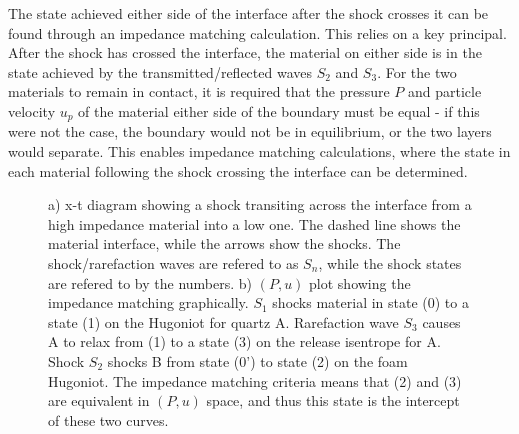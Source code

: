 The state achieved either side of the interface after the shock crosses it can be found through an impedance matching calculation. This relies on a key principal. After the shock has crossed the interface, the material on either side is in the state achieved by the transmitted/reflected waves $S_2$ and $S_3$. For the two materials to remain in contact, it is required that the pressure $P$ and particle velocity $u_p$ of the material either side of the boundary must be equal - if this were not the case, the boundary would not be in equilibrium, or the two layers would separate. This enables impedance matching calculations, where the state in each material following the shock crossing the interface can be determined.

\begin{figure}
\centering     %
{}
\caption{ \label{fig:ShockDiagramAndIMTheory1} a) x-t diagram showing a shock transiting across the interface from a high impedance material into a low one. The dashed line shows the material interface, while the arrows show the shocks. The shock/rarefaction waves are refered to as $S_n$, while the shock states are refered to by the numbers. b) $(P,u)$ plot showing the impedance matching graphically. $S_1$ shocks material in state (0) to a state (1) on the Hugoniot for quartz A. Rarefaction wave $S_3$ causes A to relax from (1) to a state (3) on the release isentrope for A. Shock $S_2$ shocks B from state (0') to state (2) on the foam Hugoniot. The impedance matching criteria means that (2) and (3) are equivalent in $(P,u)$ space, and thus this state is the intercept of these two curves.}
\end{figure}

